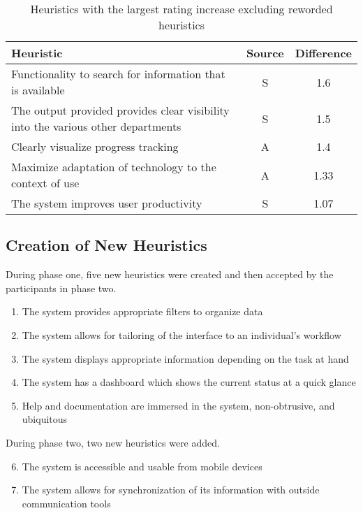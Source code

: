 \begin{table}[htbp]
	\centering
	\vspace{0.5cm}
	\caption{Heuristics with the largest rating increase excluding reworded heuristics}
	\label{tab:biggest_winners_original}
	\begin{tabularx}{\textwidth}{Xcc}	\toprule
		\textbf{Heuristic} & \textbf{Source} & \textbf{Difference} \\ \midrule
			Functionality to search for information that is available & S & 1.6 \\
			The output provided provides clear visibility into the various other departments & S & 1.5 \\
			Clearly visualize progress tracking & A & 1.4 \\
			Maximize adaptation of technology to the context of use & A & 1.33 \\
			The system improves user productivity & S & 1.07 \\
		\bottomrule
	\end{tabularx}
\end{table}

\FloatBarrier
\subsection{Creation of New Heuristics}
During phase one, five new heuristics were created and then accepted by the participants in phase two.
\begin{enumerate}
	\item The system provides appropriate filters to organize data
	\item The system allows for tailoring of the interface to an individual's workflow
	\item The system displays appropriate information depending on the task at hand
	\item The system has a dashboard which shows the current status at a quick glance
	\item Help and documentation are immersed in the system, non-obtrusive, and ubiquitous	
\end{enumerate}

During phase two, two new heuristics were added.
\begin{enumerate}
	\setcounter{enumi}{5}
	\item The system is accessible and usable from mobile devices
	\item The system allows for synchronization of its information with outside communication tools
\end{enumerate}


